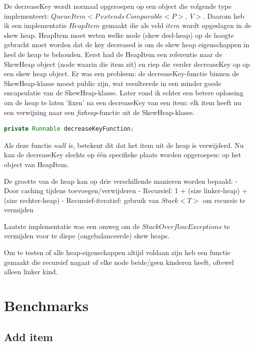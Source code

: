 \documentclass[12pt,a4paper,fleqn]{report}
\begin{document}
	De \textsf{decreaseKey} wordt normaal opgeroepen op een object die volgende type implementeert:
	\mbox{$QueueItem<P\ extends\ Comparable<P>,\ V>$}.\newline
	Daarom heb ik een implementatie $HeapItem$ gemaakt die
	als veld $item$ wordt opgeslagen in de skew heap.
	HeapItem moet weten welke node (skew deel-heap) op de hoogte gebracht moet worden dat de
	key decreased is om de skew heap eigenschappen in heel de heap te behouden. Eerst had de
	HeapItem een referentie naar de SkewHeap object (node waarin die item zit) en riep die
	verder \textsf{decreaseKey} op op een skew heap object.
	Er was een probleem: de \textsf{decreaseKey}-functie binnen de SkewHeap-klasse moest public zijn, wat resulteerde in een minder goede encapsulatie van de SkewHeap-klasse. Later vond ik echter een betere oplossing om de heap te laten 'fixen' na een \textsf{decreaseKey} van een item: elk item heeft nu een verwijzing naar een \textit{fixheap}-functie uit de SkewHeap-klasse.

	\begin{lstlisting}[language=Java]
	private Runnable decreaseKeyFunction;
\end{lstlisting}

	Als deze functie $null$ is, betekent dit dat het item uit de heap is verwijderd. Nu kan de \textsf{decreaseKey} slechts op één specifieke plaats worden opgeroepen: op het object van HeapItem.

	De grootte van de heap kan op drie verschillende manieren worden bepaald:
	- Door caching tijdens toevoegen/verwijderen\newline
	- Recursief: 1 + (size linker-heap) + (size rechter-heap)\newline
	- Recursief-iteratief: gebruik van $Stack<T>$ om recursie te vermijden\newline


	Laatste implementatie was een omweg om de $StackOverflowExceptions$ te vermijden voor te diepe (ongebalanceerde) skew heaps.

	Om te testen of alle heap-eigenschappen altijd voldaan zijn heb een functie gemaakt die
	recursief nagaat of elke node beide/geen kinderen heeft, oftewel alleen linker kind.

	\section{Benchmarks}

	\subsection{Add item}
\end{document}
